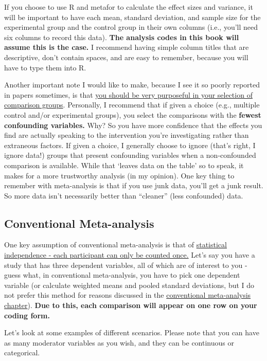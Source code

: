 \documentclass[
]{book}
\begin{document}
If you choose to use R and metafor to calculate the effect sizes and variance, it will be important to have each mean, standard deviation, and sample size for the experimental group and the control group in their own columns (i.e., you'll need six columns to record this data). \textbf{The analysis codes in this book will assume this is the case.} I recommend having simple column titles that are descriptive, don't contain spaces, and are easy to remember, because you will have to type them into R.

Another important note I would like to make, because I see it so poorly reported in papers sometimes, is that \ul{you should be very purposeful in your selection of comparison groups}. Personally, I recommend that if given a choice (e.g., multiple control and/or experimental groups), you select the comparisons with the \textbf{fewest confounding variables.} Why? So you have more confidence that the effects you find are actually speaking to the intervention you're investigating rather than extraneous factors. If given a choice, I generally choose to ignore (that's right, I ignore data!) groups that present confounding variables when a non-confounded comparison is available. While that `leaves data on the table' so to speak, it makes for a more trustworthy analysis (in my opinion). One key thing to remember with meta-analysis is that if you use junk data, you'll get a junk result. So more data isn't necessarily better than ``cleaner'' (less confounded) data.

\hypertarget{conventional-meta-analysis}{%
\subsection{Conventional Meta-analysis}\label{conventional-meta-analysis}}

One key assumption of conventional meta-analysis is that of \ul{statistical independence - each participant can only be counted once.} Let's say you have a study that has three dependent variables, all of which are of interest to you - guess what, in conventional meta-analysis, you have to pick one dependent variable (or calculate weighted means and pooled standard deviations, but I do not prefer this method for reasons discussed in the \protect\hyperlink{0}{conventional meta-analysis chapter}). \textbf{Due to this, each comparison will appear on one row on your coding form.}

Let's look at some examples of different scenarios. Please note that you can have as many moderator variables as you wish, and they can be continuous or categorical.
\end{document}
